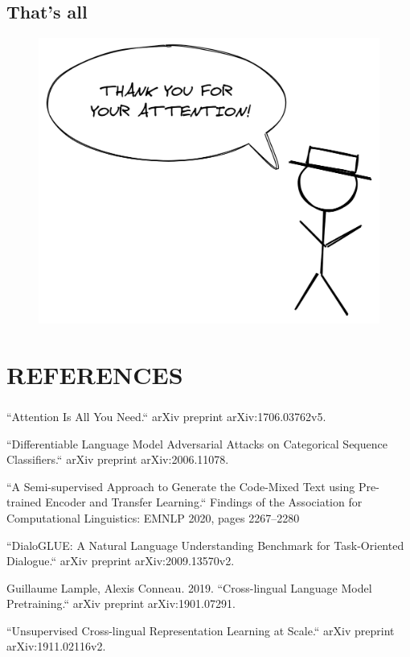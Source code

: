 \documentclass{beamer}
\begin{document}
\subsection{That's all}
\begin{frame}
\begin{figure}
	\includegraphics[width=0.9\linewidth]{images/end.png}
\end{figure}
\end{frame}



\section{REFERENCES} 

\begin{frame}
\frametitle{}
\begin{thebibliography}{0}

 ``Attention Is All You Need.`` arXiv preprint arXiv:1706.03762v5.

 ``Differentiable Language Model Adversarial Attacks on Categorical Sequence Classifiers.`` arXiv preprint arXiv:2006.11078.

 ``A Semi-supervised Approach to Generate the Code-Mixed Text using Pre-trained Encoder and Transfer Learning.`` Findings of the Association for Computational Linguistics: EMNLP 2020, pages 2267–2280

 ``DialoGLUE: A Natural Language Understanding Benchmark for Task-Oriented Dialogue.`` arXiv preprint arXiv:2009.13570v2.

 Guillaume Lample, Alexis Conneau. 2019. ``Cross-lingual Language Model Pretraining.`` arXiv preprint arXiv:1901.07291.

 ``Unsupervised Cross-lingual Representation Learning at Scale.`` arXiv preprint arXiv:1911.02116v2.

\end{thebibliography}
\end{frame}
\end{document}
